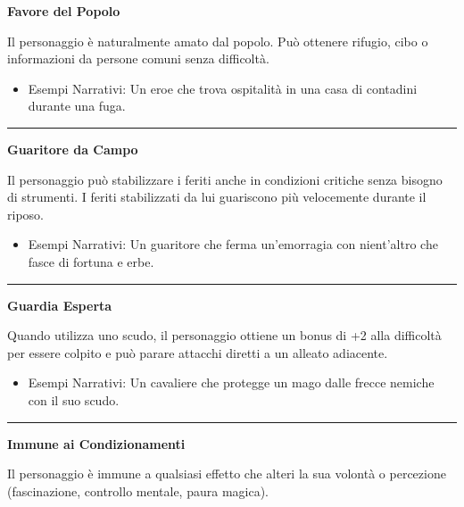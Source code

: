 \documentclass[../manuale_main.tex]{subfiles}
\begin{document}
\begin{center}
\textbf{\large{Favore del Popolo}}\\
\end{center}
Il personaggio è naturalmente amato dal popolo. Può ottenere rifugio, cibo o informazioni da persone comuni senza difficoltà.

\begin{itemize}
\item Esempi Narrativi: Un eroe che trova ospitalità in una casa di contadini durante una fuga.
\end{itemize}

\vspace{0.5cm}\rule{\textwidth}{0.4pt}\vspace{1cm}

\begin{center}
\textbf{\large{Guaritore da Campo}}\\
\end{center}
Il personaggio può stabilizzare i feriti anche in condizioni critiche senza bisogno di strumenti. I feriti stabilizzati da lui guariscono più velocemente durante il riposo.

\begin{itemize}
\item Esempi Narrativi: Un guaritore che ferma un’emorragia con nient'altro che fasce di fortuna e erbe.
\end{itemize}

\vspace{0.5cm}\rule{\textwidth}{0.4pt}\vspace{1cm}

\begin{center}
\textbf{\large{Guardia Esperta}}\\
\end{center}
Quando utilizza uno scudo, il personaggio ottiene un bonus di +2 alla difficoltà per essere colpito e può parare attacchi diretti a un alleato adiacente.

\begin{itemize}
\item Esempi Narrativi: Un cavaliere che protegge un mago dalle frecce nemiche con il suo scudo.
\end{itemize}

\vspace{0.5cm}\rule{\textwidth}{0.4pt}\vspace{1cm}

\begin{center}
\textbf{\large{Immune ai Condizionamenti}}\\
\end{center}
Il personaggio è immune a qualsiasi effetto che alteri la sua volontà o percezione (fascinazione, controllo mentale, paura magica).
\end{document}
